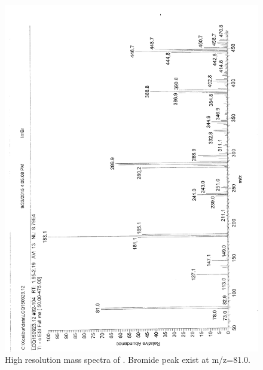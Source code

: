 \documentclass[journal=jacsat,manuscript=article]{achemso}
\begin{document}
\begin{figure}
\includegraphics[height=\textheight-2\baselineskip]{mass_PImBr.png}
\caption{High resolution mass spectra of . Bromide peak exist at m/z=81.0.}
\end{figure}
\end{document}
